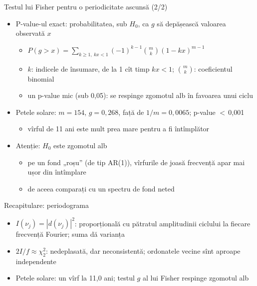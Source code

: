 \begin{frame}{Testul lui Fisher pentru o periodicitate ascunsă (2/2)}
\itemsize{\small}
\begin{itemize}
    \item P-value-ul exact: probabilitatea, sub $H_0$, ca $g$ să depășească valoarea observată $x$
    \begin{itemize}
        \item $P(g > x) = \sum_{k \ge 1,\ kx < 1}(-1)^{k-1}\binom{m}{k}(1 - kx)^{m-1}$
        \item $k$: indicele de însumare, de la 1 cît timp $kx < 1$; $\binom{m}{k}$: coeficientul binomial
        \item un p-value mic (sub 0,05): se respinge zgomotul alb în favoarea unui ciclu
    \end{itemize}
    \item Petele solare: $m = 154$, $g = 0{,}268$, față de $1/m = 0{,}0065$; p-value $<$\,0{,}001
    \begin{itemize}
        \item vîrful de 11 ani este mult prea mare pentru a fi întîmplător
    \end{itemize}
    \item Atenție: $H_0$ este zgomotul alb
    \begin{itemize}
        \item pe un fond „roșu” (de tip AR(1)), vîrfurile de joasă frecvență apar mai ușor din întîmplare
        \item de aceea comparați cu un spectru de fond neted
    \end{itemize}
\end{itemize}
\end{frame}

\begin{frame}{Recapitulare: periodograma}
\itemsize{\small}
\begin{itemize}
    \item $I(\nu_j) = |d(\nu_j)|^2$: proporțională cu pătratul amplitudinii ciclului la fiecare frecvență Fourier; suma dă varianța
    \item $2I/f \approx \chi^2_2$: nedeplasată, dar neconsistentă; ordonatele vecine sînt aproape independente
    \item Petele solare: un vîrf la 11{,}0 ani; testul $g$ al lui Fisher respinge zgomotul alb
\end{itemize}
\end{frame}


